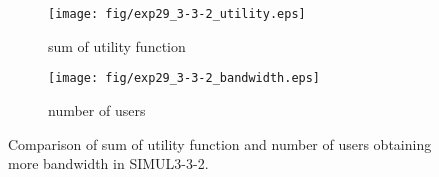 \begin{figure}
	\begin{center}
		\begin{subfigure}[b]{0.8\textwidth}
			\centering
			\texttt{[image: fig/exp29\_3-3-2\_utility.eps]}
			\caption{sum of utility function}
			\label{figure:simul3_3_2_u_a}
		\end{subfigure}
		\begin{subfigure}[b]{0.8\textwidth}
			\centering
			\texttt{[image: fig/exp29\_3-3-2\_bandwidth.eps]}
			\caption{number of users}
			\label{figure:simul3_3_2_u_b}
		\end{subfigure}
		\caption{Comparison of sum of utility function and number of users obtaining more bandwidth in SIMUL3-3-2.}
		\label{figure:simul3_3_2_u}
	\end{center}
\end{figure}

\clearpage

